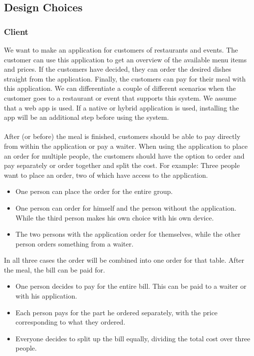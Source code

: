 \documentclass[12pt]{article}
\begin{document}
\begin{multicols}{2}
\subsection{Design Choices}
\subsubsection{Client}
We want to make an application for customers of restaurants and events. The customer can use this application to get an overview of the available menu items and prices. If the customers have decided, they can order the desired dishes straight from the application. Finally, the customers can pay for their meal with this application.
We can differentiate a couple of different scenarios when the customer goes to a restaurant or event that supports this system. We assume that a web app is used. If a native or hybrid application is used, installing the app will be an additional step before using the system.
\\\\
After (or before) the meal is finished, customers should be able to pay directly from within the application or pay a waiter. When using the application to place an order for multiple people, the customers should have the option to order and pay separately or order together and split the cost. 
For example: Three people want to place an order, two of which have access to the application. 
\begin{itemize}
	\raggedright
	\item One person can place the order for the entire group.
	\item One person can order for himself and the person without the application. While the third person makes his own choice with his own device.
	\item The two persons with the application order for themselves, while the other person orders something from a waiter.
\end{itemize}

\noindent 
In all three cases the order will be combined into one order for that table. After the meal, the bill can be paid for.

\begin{itemize}
	\raggedright
	\item One person decides to pay for the entire bill. This can be paid to a waiter or with his application.
	\item Each person pays for the part he ordered separately, with the price corresponding to what they ordered.
	\item Everyone decides to split up the bill equally, dividing the total cost over three people. 
\end{itemize}


\end{multicols}
\end{document}
